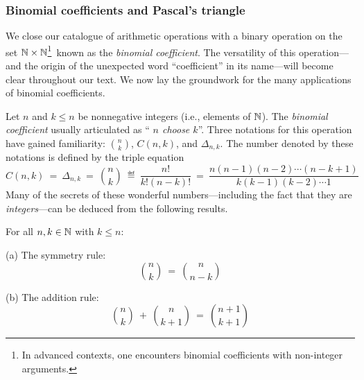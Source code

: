 \subsubsection{Binomial coefficients and Pascal's triangle}
\label{sec:binomial-coeff}

We close our catalogue of arithmetic operations with a binary
operation on the set $\mathbb{N} \times \mathbb{N}$\footnote{In advanced contexts, one
  encounters binomial coefficients with non-integer arguments.}~known
as the {\it binomial coefficient}.  The versatility of this
operation---and the origin of the unexpected word ``coefficient'' in
its name---will become clear throughout our text.  We now lay the
groundwork for the many applications of binomial coefficients.


\medskip

Let $n$ and $k \leq n$ be nonnegative integers (i.e., elements of
$\mathbb{N}$).  The {\it binomial coefficient} usually articulated as ``{\it
  $n$ choose $k$}''.
Three notations for this operation have gained familiarity:
$\displaystyle {n \choose k}$, $C(n,k)$, and $\Delta_{n,k}$.  The
number denoted by these notations is defined by the triple equation
\begin{equation}
\label{eq:binom-coeff}
C(n,k) \ = \
\Delta_{n,k} \ = \
{n \choose k} \ \eqdef \ \frac{n!}{k!(n-k)!} \ = \
\frac{n(n-1)(n-2) \cdots (n-k+1)}{k (k-1)(k-2) \cdots 1}
\end{equation}
Many of the secrets of these wonderful numbers---including the fact
that they are {\em integers}---can be deduced from the following
results.

\begin{prop}
\label{thm:manipulate-binom-coeff}
For all $n, k \in \mathbb{N}$ with $k \leq n$:

{\rm (a)} The symmetry rule:
\begin{equation}
\label{eq:symmetry-binom-coeff}
{n \choose k} \ = \ {n \choose {n-k}}
\end{equation}

{\rm (b)} The addition rule:
\begin{equation}
\label{eq:add-binom-coeff}
{n \choose k} \ + \ {n \choose {k+1}} \ = \ {{n+1} \choose {k+1}}
\end{equation}
\end{prop}

